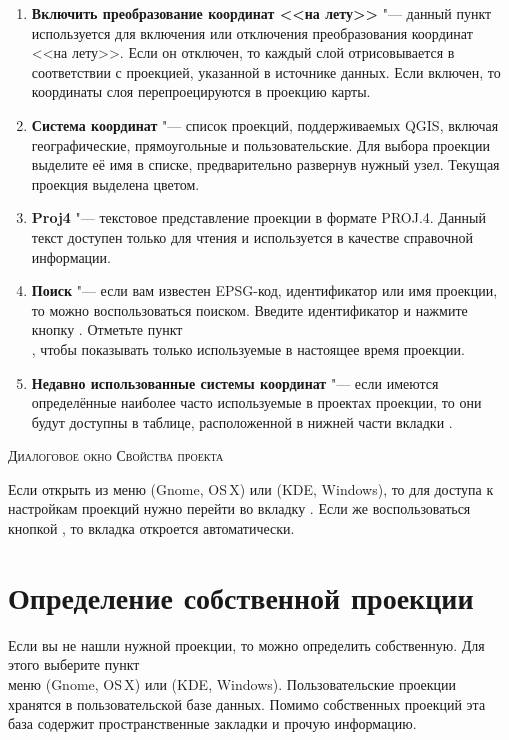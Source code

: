 \begin{enumerate}
\item \textbf{Включить преобразование координат <<на лету>>}
"--- данный пункт используется для включения или отключения преобразования
координат <<на лету>>. Если он отключен, то каждый слой отрисовывается в
соответствии с проекцией, указанной в источнике данных. Если включен, то
координаты слоя перепроецируются в проекцию карты.
\item \textbf{Система координат} "--- список проекций, поддерживаемых QGIS,
включая географические, прямоугольные и пользовательские. Для выбора проекции
выделите её имя в списке, предварительно развернув нужный узел. Текущая
проекция выделена цветом.
\item \textbf{Proj4} "--- текстовое представление проекции в формате
PROJ.4. Данный текст доступен только для чтения и используется в
качестве справочной информации.
\item \textbf{Поиск} "--- если вам известен EPSG-код, идентификатор или имя
проекции, то можно воспользоваться поиском. Введите идентификатор и нажмите
кнопку . Отметьте пункт \\
, чтобы показывать только
используемые в настоящее время проекции.
\item \textbf{Недавно использованные системы координат} "--- если имеются
определённые наиболее часто используемые в проектах проекции, то они будут
доступны в таблице, расположенной в нижней части вкладки .
\end{enumerate}

\begin{Tip}
\caption{\textsc{Диалоговое окно Свойства проекта}}
Если открыть  из меню 
(Gnome, OS\,X) или  (KDE, Windows), то для доступа к
настройкам проекций нужно перейти во вкладку . Если
же воспользоваться кнопкой
, то
вкладка  откроется автоматически.
\end{Tip}

\section{Определение собственной проекции}\label{sec:customprojections}

Если вы не нашли нужной проекции, то можно определить собственную. Для этого
выберите пункт \\
 меню
 (Gnome, OS\,X) или  (KDE,
Windows). Пользовательские проекции хранятся в пользовательской базе
данных. Помимо собственных проекций эта база содержит пространственные
закладки и прочую информацию.

